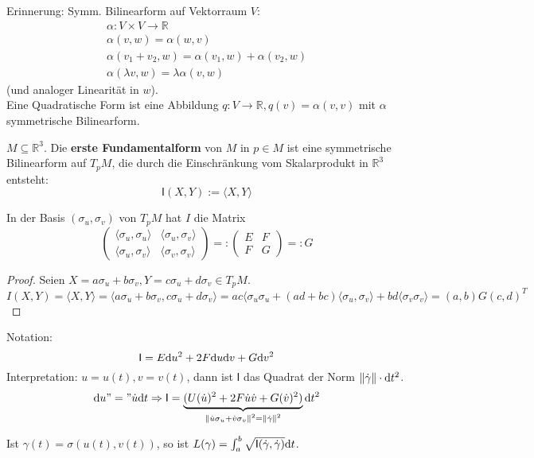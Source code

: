 \documentclass[11pt]{article}
\begin{document}
\begin{remark}
Erinnerung: Symm. Bilinearform auf Vektorraum $V$: \begin{align*}
    \alpha: V\times V \to \mathbb R\\
    \alpha(v,w) = \alpha(w,v)\\
    \alpha(v_1+v_2, w) = \alpha(v_1,w) + \alpha(v_2, w)\\
    \alpha(\lambda v, w) = \lambda \alpha (v,w)
\end{align*}
(und analoger Linearität in $w$).\\
Eine Quadratische Form ist eine Abbildung $q: V\to \mathbb R, q(v) = \alpha(v,v)$ mit $\alpha$ symmetrische Bilinearform.
\end{remark}
\begin{definition}
$M\subseteq \mathbb R^3$. Die \textbf{erste Fundamentalform} von $M$ in $p\in M$ ist eine symmetrische Bilinearform auf $T_pM$, die durch die Einschränkung vom Skalarprodukt in $\mathbb R^3$ entsteht:\begin{equation*}
    \mathsf I(X,Y) := \langle X, Y\rangle
\end{equation*}
\end{definition}
\begin{lemma}
In der Basis $(\sigma_u, \sigma_v)$ von $T_pM$ hat $I$ die Matrix\begin{equation*}
    \left(\begin{array}{cc}
        \langle \sigma_u, \sigma_u\rangle & \langle \sigma_u, \sigma_v\rangle\\
        \langle \sigma_u, \sigma_v\rangle & \langle \sigma_v, \sigma_v\rangle
    \end{array}\right) =:
    \left(\begin{array}{cc}
       E&F\\
       F&G
    \end{array}\right)=:G
\end{equation*}
\end{lemma}
\begin{proof}
Seien $X = a\sigma_u + b\sigma_v, Y =  c\sigma_u + d\sigma_v \in T_p M$. \begin{equation*}
    I (X,Y) = \langle X,Y\rangle = \langle a\sigma_u + b\sigma_v, c\sigma_u + d\sigma_v\rangle = ac \langle \sigma_u\sigma_u + (ad + bc)\langle \sigma_u,\sigma_v\rangle + bd\langle \sigma_v\sigma_v\rangle = (a,b)G(c,d)^T
\end{equation*}
\end{proof}
\begin{remark}
Notation:\begin{equation*}
    \mathsf I = E\mathrm{d} u^2 + 2F\mathrm{d} u\mathrm{d} v + G\mathrm{d} v^2
\end{equation*}
Interpretation:  $u= u(t), v= v(t)$, dann ist $\mathsf I$ das Quadrat der Norm $\left\lVert\dot\gamma\right\rVert\cdot \mathrm{d} t^2$. $$\mathrm{d} u "=" \dot u\mathrm{d} t \Rightarrow \mathsf I = \underbrace{(U(\dot u)^2 +2F\dot u\dot v + G(\dot v)^2)}_{\left\lVert\dot u\sigma_u + \dot v\sigma_v\right\rVert^2 = \left\lVert\dot \gamma\right\rVert^2}\mathrm{d} t^2$$
\end{remark}
\begin{theorem}
Ist $\gamma(t) = \sigma(u(t), v(t))$, so ist $L(\gamma)= \int_a^b\sqrt{\mathsf I(\dot\gamma,\dot\gamma)}\mathrm{d} t$.
\end{theorem}
\end{document}
